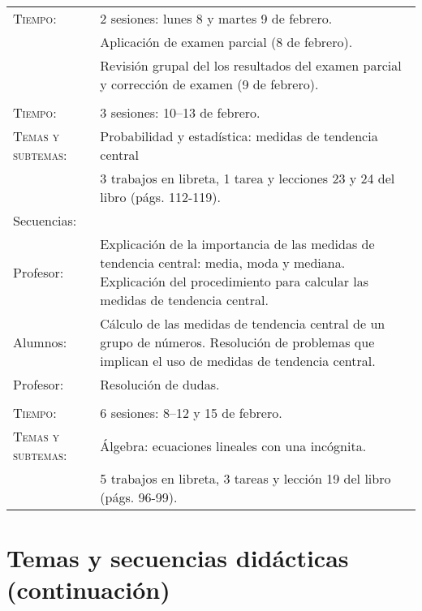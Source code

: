 \documentclass[letterpaper,10pt]{article}
\begin{document}
\begin{tabular}[t]{R{0.25\textwidth}p{0.71\textwidth}}
    \textsc{Tiempo:}& 2 sesiones: lunes 8 y martes 9  de febrero. \\
            & {\Large \sc Aplicaci\'on de examen parcial} (8 de febrero). \\           
            & Revisi\'on grupal del los resultados del examen parcial y
            correcci\'on de examen (9 de febrero).\\
\hline\\

    \textsc{Tiempo:}           & 3 sesiones: 10--13  de febrero. \\
    \textsc{Temas y subtemas:} & Probabilidad y estad\'istica: medidas de
    tendencia central \\
     & 3 trabajos en libreta, 1 tarea y lecciones 23 
    y 24 del libro (p\'ags. 112-119). \\
    \large{\sc Secuencias:} \\
    
    Profesor:    & Explicaci\'on de la importancia de las medidas de tendencia
    central: media, moda y mediana. Explicaci\'on del procedimiento para 
    calcular las medidas de tendencia central. \\
    
    Alumnos:     & C\'alculo de las medidas de tendencia central de un grupo de 
    n\'umeros. Resoluci\'on de problemas que implican el uso de medidas de
    tendencia central. \\
    
    Profesor:   & Resoluci\'on de dudas.
\\ \hline \\

    \textsc{Tiempo:}           & 6 sesiones: 8--12 y 15 de febrero. \\
    \textsc{Temas y subtemas:} & \'Algebra: ecuaciones lineales con una
    inc\'ognita. \\
     & 5 trabajos en libreta, 3 tareas y lecci\'on 19 
    del libro (p\'ags. 96-99). \\
\end{tabular}

\newpage

\section{Temas  y secuencias did\'acticas (continuaci\'on)}

\vfill
\end{document}
